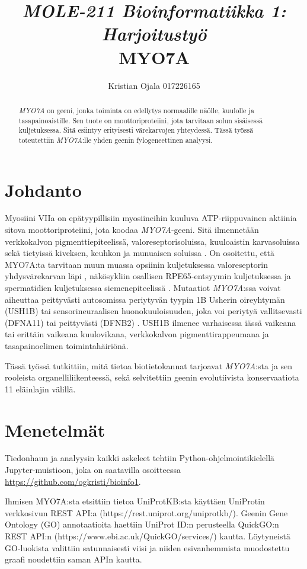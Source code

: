 \documentclass[a4paper,11pt,notitlepage]{article}
\title{\textit{\normalsize MOLE-211 Bioinformatiikka 1: Harjoitustyö}\\ \textbf{MYO7A}}
\author{Kristian Ojala 017226165}
\date{}
\begin{document}
\maketitle

\renewcommand{\abstractname}{Tiivistelmä}
\begin{abstract}
\textit{MYO7A} on geeni, jonka toiminta on edellytys normaalille näölle, kuulolle ja tasapainoaistille. Sen tuote on moottoriproteiini, jota tarvitaan solun sisäisessä kuljetuksessa. Sitä esiintyy erityisesti värekarvojen yhteydessä. Tässä työssä toteutettiin \textit{MYO7A}:lle yhden geenin fylogeneettinen analyysi.
\end{abstract}

\section{Johdanto}
Myosiini VIIa on epätyypillisiin myosiineihin kuuluva ATP-riippuvainen aktiinia sitova moottoriproteiini, jota koodaa \textit{MYO7A}-geeni. Sitä ilmennetään verkkokalvon pigmenttiepiteelissä, valoreseptorisoluissa, kuuloaistin karvasoluissa sekä tietyissä kiveksen, keuhkon ja munuaisen soluissa \cite{hasson1995,liu1997}. On osoitettu, että MYO7A:ta tarvitaan muun muassa opsiinin kuljetuksessa valoreseptorin yhdysvärekarvan läpi \cite{liu1999}, näkösykliin osallisen RPE65-entsyymin kuljetuksessa \cite{lopes2011} ja spermatidien kuljetuksessa siemenepiteelissä \cite{wen2019}. Mutaatiot \textit{MYO7A}:ssa voivat aiheuttaa peittyvästi autosomissa periytyvän tyypin 1B Usherin oireyhtymän (USH1B) tai sensorineuraalisen huonokuuloisuuden, joka voi periytyä vallitsevasti (DFNA11) tai peittyvästi (DFNB2) \cite{riazuddin2008}. USH1B ilmenee varhaisessa iässä vaikeana tai erittäin vaikeana kuulovikana, verkkokalvon pigmenttirappeumana ja tasapainoelimen toimintahäiriönä.

Tässä työssä tutkittiin, mitä tietoa biotietokannat tarjoavat \textit{MYO7A}:sta ja sen rooleista organelliliikenteessä, sekä selvitettiin geenin evolutiivista konservaatiota 11 eläinlajin välillä.

\section{Menetelmät}
Tiedonhaun ja analyysin kaikki askeleet tehtiin Python-ohjelmointikielellä Jupyter-muistioon, joka on saatavilla osoitteessa \url{https://github.com/ogkristi/bioinfo1}.

Ihmisen MYO7A:sta etsittiin tietoa UniProtKB:sta käyttäen UniProtin verkkosivun REST API:a (https://rest.uniprot.org/uniprotkb/). Geenin Gene Ontology (GO) annotaatioita haettiin UniProt ID:n perusteella QuickGO:n REST API:n (https://www.ebi.ac.uk/QuickGO/services/) kautta. Löytyneistä GO-luokista valittiin satunnaisesti viisi ja niiden esivanhemmista muodostettu graafi noudettiin saman APIn kautta.
\end{document}
